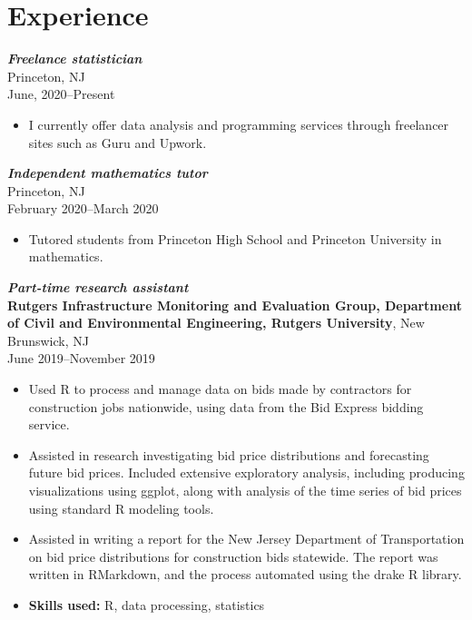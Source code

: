 \documentclass[letterpaper,12pt]{article}
\begin{document}
\section*{Experience}

\textit{\textbf{Freelance statistician}} \\
Princeton, NJ \\
June, 2020--Present
\begin{itemize}
\item I currently offer data analysis and programming services through
  freelancer sites such as Guru and Upwork.
\end{itemize}

\textit{\textbf{Independent mathematics tutor}} \\
Princeton, NJ \\
February 2020--March 2020
\begin{itemize}
\item Tutored students from Princeton High School and Princeton
  University in mathematics.
\end{itemize}

\textit{\textbf{Part-time research assistant}} \\
\textbf{Rutgers Infrastructure Monitoring and Evaluation Group,
  Department of Civil and Environmental Engineering, Rutgers
  University},
New Brunswick, NJ \\
June 2019--November 2019
\begin{itemize}
\item Used R to process and manage data on bids made by contractors
  for construction jobs nationwide, using data from the Bid Express
  bidding service.
\item Assisted in research investigating bid price distributions and
  forecasting future bid prices. Included extensive exploratory
  analysis, including producing visualizations using ggplot, along
  with analysis of the time series of bid prices using standard R
  modeling tools.
\item Assisted in writing a report for the New Jersey Department of
  Transportation on bid price distributions for construction bids
  statewide. The report was written in RMarkdown, and the process
  automated using the drake R library.
\item \textbf{Skills used:} R, data processing, statistics
\end{itemize}
\end{document}
